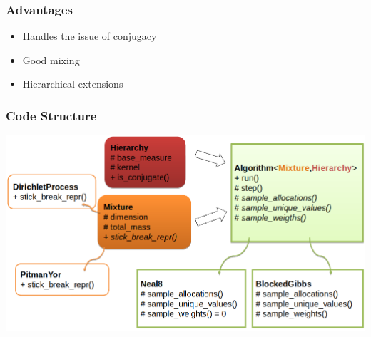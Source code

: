\begin{frame}
	\frametitle{Advantages}
		\begin{itemize}
		     \item Handles the issue of conjugacy
		    \item Good mixing %
		    \item Hierarchical extensions
	\end{itemize}
\end{frame}

\begin{frame}
	\frametitle{Code Structure}
	\includegraphics[width=\linewidth]{etc/code_map.png}
\end{frame}
